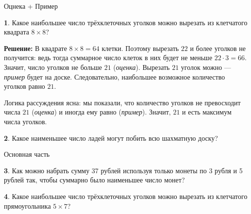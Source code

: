 \documentclass[b5paper,usehyperref, twoside]{article}
\theoremstyle{definition}
\theoremstyle{definition}
\newtheorem{Task}{}
\begin{document}
	
	
	
	\centerline{\LARGE Оцнека + Пример}
	
	
	
	
	\begin{Task}
		Какое наибольшее число трёхклеточных уголков можно вырезать из клетчатого квадрата $8 \times 8$?
	\end{Task}
	
	
	\textbf{Решение:} В квадрате $8 \times 8=64$ клетки. Поэтому вырезать $22$ и более уголков не получится: ведь тогда суммарное число клеток в них будет не меньше $22\cdot 3 = 66$. Значит, число уголков не больше $21$ (\textit{оценка}).
	Вырезать $21$ уголок можно --- \textit{пример} будет на доске. Следовательно, наибольшее возможное количество уголков равно $21$.
	
	Логика рассуждения ясна: мы показали, что количество уголков не превосходит числа $21$
	(\textit{оценка}) и иногда ему равно (\textit{пример}). Значит, $21$ и есть максимум числа уголков.
	
	
	\begin{Task}
		Какое наименьшее число ладей могут побить всю шахматную доску?
	\end{Task}
	
	\centerline{\LARGE Основная часть}
	
	\begin{Task}
		Как можно набрать сумму 37 рублей используя только монеты по 3 рубля и 5 рублей так, чтобы суммарно было наименьшее число монет?
	\end{Task} 
	
	\begin{Task}
		Какое наибольшее число трёхклеточных уголков можно вырезать из клетчатого прямоугольника $5 \times 7$?
	\end{Task}
	
\end{document}
